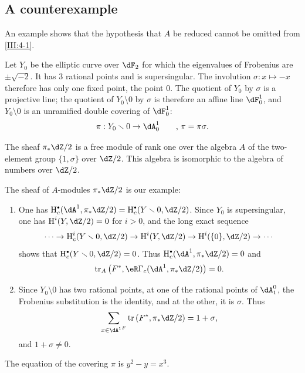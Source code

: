 





\subsection{A counterexample}\label{III:4-5}

An example shows that the hypothesis that $A$ be reduced cannot be omitted
from \ref{III:4-1}.

Let $Y_0$ be the elliptic curve over $\dF_2$ for which the eigenvalues of
Frobenius are $\pm \sqrt{-2}$. It has $3$ rational points and is
supersingular. The involution $\sigma:x\mapsto -x$ therefore has only one
fixed point, the point $0$. The quotient of $Y_0$ by $\sigma$ is a projective
line; the quotient of $Y_0\setminus 0$ by $\sigma$ is therefore an affine
line $\dF_0^1$, and $Y_0\setminus 0$ is an unramified double covering of
$\dF_0^1$:
\[
  \pi:Y_0\setminus 0 \to \dA_0^1 \qquad \text{, $\pi=\pi\sigma$.}
\]

The sheaf $\pi_*\dZ/2$ is a free module of rank one over the algebra $A$ of
the two-element group $\{1,\sigma\}$ over $\dZ/2$. This algebra is isomorphic
to the algebra of numbers over $\dZ/2$.

The sheaf of $A$-modules $\pi_*\dZ/2$ is our example:
\begin{enumerate}[\indent a)]
  \item One has
    $\h_c^\bullet(\dA^1,\pi_*\dZ/2) = \h_c^\bullet(Y\setminus 0,\dZ/2)$.
    Since $Y_0$ is supersingular, one has $\h^i(Y,\dZ/2)=0$ for $i>0$, and
    the long exact sequence
    \[
      \cdots \to \h_c^i(Y\setminus 0,\dZ/2) \to \h^i(Y,\dZ/2) \to \h^i(\{0\},\dZ/2) \to \cdots
    \]
    shows that $\h_c^\bullet(Y\setminus 0,\dZ/2)=0$. Thus
    $\h_c^\bullet(\dA^1,\pi_*\dZ/2)=0$ and
    \[
      \tr_A\left(F^*,\eR\Gamma_c(\dA^1,\pi_*\dZ/2)\right) = 0 \text{.}
    \]
  \item Since $Y_0\setminus 0$ has two rational points, at one of the
    rational points of $\dA_1^0$, the Frobenius substitution is the identity,
    and at the other, it is $\sigma$. Thus
    \[
      \sum_{x\in {\dA^1}^F} \tr\left(F^*,\pi_*\dZ/2\right) = 1+\sigma \text{,}
    \]
    and $1+\sigma\ne 0$.
\end{enumerate}

The equation of the covering $\pi$ is $y^2-y=x^3$.
